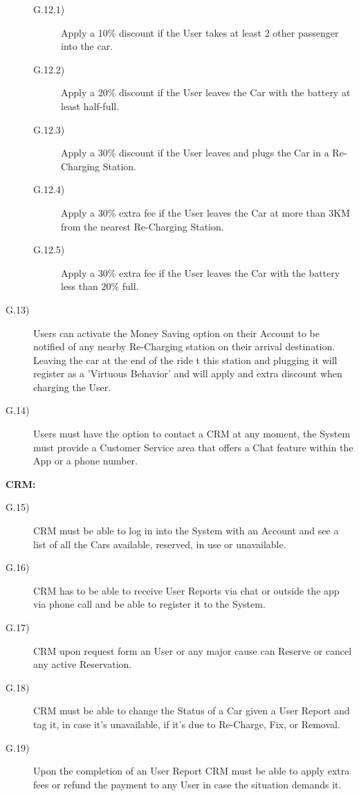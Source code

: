 \documentclass[a4paper]{article}
\begin{document}
\begin{description}
\begin{description}
\item [G.12.1)]Apply a 10\% discount if the User takes at least 2 other passenger into the car.
\item [G.12.2)]Apply a 20\% discount if the User leaves the Car with the battery at least half-full.
\item [G.12.3)]Apply a 30\% discount if the User leaves and plugs the Car in a Re-Charging Station.
\item [G.12.4)]Apply a 30\% extra fee if the User leaves the Car at more than 3KM from the nearest Re-Charging Station.
\item [G.12.5)]Apply a 30\% extra fee if the User leaves the Car with the battery less than 20\% full.
\end{description}
\item [G.13)]Users can activate the Money Saving option on their Account to be notified of any nearby Re-Charging station on their arrival destination. Leaving the car at the end of the ride t this station and plugging it will register as a 'Virtuous Behavior' and will apply and extra discount when charging the User.
\item [G.14)]Users must have the option to contact a CRM at any moment, the System must provide a Customer Service area that offers a Chat feature within the App or a phone number.
\end{description}
\textbf{CRM:}
\begin{description}
\item [G.15)]CRM must be able to log in into the System with an Account and see a list of all the Cars available, reserved, in use or unavailable.
\item [G.16)]CRM has to be able to receive User Reports via chat or outside the app via phone call and be able to register it to the System.
\item [G.17)]CRM upon request form an User or any major cause can Reserve or cancel any active Reservation.
\item [G.18)]CRM must be able to change the Status of a Car given a User Report and tag it, in case it's unavailable, if it's due to Re-Charge, Fix, or Removal.
\item [G.19)]Upon the completion of an User Report CRM must be able to apply extra fees or refund the payment to any User in case the situation demands it.
\end {description}

\newpage
\end{document}
